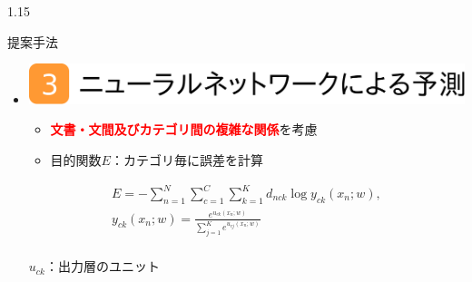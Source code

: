 \documentclass[unicode,10pt]{beamer}
\newlength{\mycolumnwidth}
\newlength{\mytitlefigureheight}
\newcommand{\itemtitle}[1]{\textbf{#1}\\}
\newcommand{\fire}[1]{\textcolor{red}{\textbf{#1}}}
\newcommand{\doublecolumns}[4]{
    \begin{minipage}[t]{#1}
      #2
    \end{minipage}
    \begin{minipage}[t]{#3}
      #4
    \end{minipage}}
\begin{document}
\begin{frame}[t]
\begin{columns}[onlytextwidth,t]
\begin{column}{1.15\mycolumnwidth}
\begin{block}{提案手法}
\begin{itemize}
      \item \itemtitle{\includegraphics[height=\mytitlefigureheight]
                                       {fig/poster_model_title_3.pdf}}
          \begin{itemize}
            \item \fire{文書・文間及びカテゴリ間の複雑な関係}を考慮
            \item 目的関数$E$：カテゴリ毎に誤差を計算
          \end{itemize}
        \doublecolumns{0.6\linewidth}{
          \vspace{-1.5em} %
          \begin{gather*}
            E = - \sum^{N}_{n = 1} \sum^{C}_{c = 1} \sum^{K}_{k = 1}
                  d_{nck} \log{y_{ck}(x_n; w)},
            \label{eq:NNObjective} \\
            y_{ck}(x_n; w) = \frac{e^{u_{ck}(x_n; w)}}
                                  {\sum^{K}_{j = 1} e^{u_{cj}(x_n; w)}}%
            \nonumber \\
          \end{gather*}
        }{0.375\linewidth}{
          \small
          $u_{ck}$：出力層のユニット \\
}
\end{itemize}
\end{block}
\end{column}
\end{columns}
\end{frame}
\end{document}
